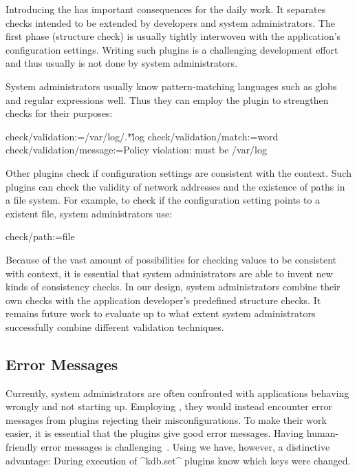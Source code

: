 Introducing the  has important consequences for the daily work.
It separates checks intended to be extended by developers and system administrators.
The first phase (structure check) is usually tightly interwoven with the application's configuration settings.
Writing such plugins is a challenging development effort and thus usually is not done by system administrators.

System administrators usually know pattern-matching languages such as globs and regular expressions well.
Thus they can employ the plugin  to strengthen checks for their purposes:

\begin{code}
  check/validation:=/var/log/.*\.log
  check/validation/match:=word
  check/validation/message:=Policy violation: must be /var/log
\end{code}

Other plugins check if configuration settings are consistent with the context.
Such plugins can check the validity of network addresses and the existence of paths in a file system.
For example, to check if the configuration setting points to a existent file, system administrators use:

\begin{code}
  check/path:=file
\end{code}

Because of the vast amount of possibilities for checking values to be consistent with context, it is essential that system administrators are able to invent new kinds of consistency checks.
In our design, system administrators combine their own checks with the application developer's predefined structure checks.
It remains future work to evaluate up to what extent system administrators successfully combine different validation techniques.


\subsection{Error Messages}

Currently, system administrators are often confronted with applications behaving wrongly and not starting up.
Employing \elektra{}, they would instead encounter error messages from plugins rejecting their misconfigurations.
To make their work easier, it is essential that the plugins give good error messages.
Having human-friendly error messages is challenging~\cite{lee2011personifying,zhang2014configuration,loncaric2016practical}.
Using \elektra{} we have, however, a distinctive advantage:
During execution of ^kdb.set^ plugins know which keys were changed.


